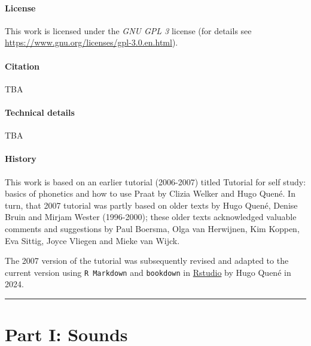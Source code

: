 \documentclass[
]{book}
\begin{document}
\subsection*{License}\label{license}

This work is licensed under the \emph{GNU GPL 3} license (for details see
\url{https://www.gnu.org/licenses/gpl-3.0.en.html}).

\subsection*{Citation}\label{citation}

TBA

\subsection*{Technical details}\label{technical-details}

TBA

\subsection*{History}\label{history}

This work is based on an earlier tutorial (2006-2007) titled Tutorial for self study: basics of phonetics and how to use Praat by Clizia Welker and Hugo Quené. In turn, that 2007 tutorial was partly based on older texts by Hugo Quené, Denise Bruin and Mirjam Wester (1996-2000); these older texts acknowledged valuable comments and suggestions by Paul Boersma, Olga van Herwijnen, Kim Koppen, Eva Sittig, Joyce Vliegen and Mieke van Wijck.

The 2007 version of the tutorial was subsequently revised and adapted to the current version using \texttt{R\ Markdown} \citep{rmarkdown2018} and \texttt{bookdown} \citep{R-bookdown} in \href{https://www.rstudio.com}{Rstudio} by Hugo Quené in 2024.

\begin{center}\rule{0.5\linewidth}{0.5pt}\end{center}

\part*{Part I: Sounds}\label{part-part-i-sounds}
\end{document}
